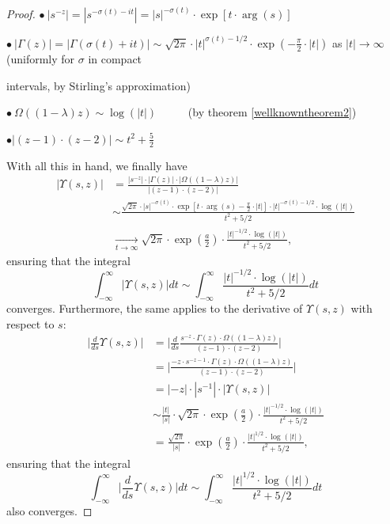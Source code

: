 \documentclass[11pt]{amsart}
\numberwithin{equation}{section}
\newcommand{\diint}{\displaystyle \int}
\newcommand{\difrac}{\displaystyle \frac}
\begin{document}
\begin{proof}
\noindent $\bullet \ |s^{-z}| = |s^{-\sigma(t) - it}| = |s|^{-\sigma(t)} \cdot \exp[t \cdot \arg(s)]$

\noindent $\bullet \ |\Gamma(z)| = |\Gamma(\sigma(t) + it)| \sim \sqrt{2\pi} \cdot |t|^{\sigma(t) - 1/2} \cdot \exp\left(-\difrac{\pi}{2} \cdot |t|\right)$ as $|t| \to \infty$ (uniformly for $\sigma$ in compact 

\noindent intervals, by Stirling's approximation)

\noindent $\bullet \ \Omega((1 - \lambda)z) \sim \log(|t|)$ \ \ \ \ \ (by theorem \ref{wellknowntheorem2})

\noindent $\bullet |(z - 1) \cdot (z - 2)| \sim t^2 + \difrac{5}{2}$

With all this in hand, we finally have \begin{equation*} \begin{split} |\Upsilon(s, z)| & = \difrac{|s^{-z}| \cdot |\Gamma(z)| \cdot |\Omega((1 - \lambda)z)|}{|(z - 1) \cdot (z - 2)|} \\ & \sim \difrac{\sqrt{2\pi} \cdot |s|^{-\sigma(t)} \cdot \exp\left[t \cdot \arg(s) - \difrac{\pi}{2} \cdot |t|\right] \cdot |t|^{-\sigma(t) - 1/2} \cdot \log(|t|)}{t^2 + 5/2} \\ & \xrightarrow[t \to \infty]{} \sqrt{2\pi} \cdot \exp\left(\difrac{a}{2}\right) \cdot \difrac{|t|^{-1/2} \cdot \log(|t|)}{t^2 + 5/2}, \end{split} \end{equation*} ensuring that the integral $$\diint_{-\infty}^{\infty} |\Upsilon(s, z)| dt \sim \diint_{-\infty}^{\infty} \difrac{|t|^{-1/2} \cdot \log(|t|)}{t^2 + 5/2} dt$$ converges. Furthermore, the same applies to the derivative of $\Upsilon(s, z)$ with respect to $s$: \begin{equation*} \begin{split} \Bigg|\difrac{d}{ds} \Upsilon(s, z)\Bigg| & = \Bigg| \difrac{d}{ds} \difrac{s^{-z} \cdot \Gamma(z) \cdot \Omega((1 - \lambda)z)}{(z - 1) \cdot (z - 2)} \Bigg| \\ & = \Bigg| \difrac{-z \cdot s^{- z - 1} \cdot \Gamma(z) \cdot \Omega((1 - \lambda)z)}{(z - 1) \cdot (z - 2)}\Bigg| \\ & = |-z| \cdot |s^{-1}| \cdot |\Upsilon(s, z)| \\ & \sim \difrac{|t|}{|s|} \cdot \sqrt{2\pi} \cdot \exp\left(\difrac{a}{2}\right) \cdot \difrac{|t|^{-1/2} \cdot \log(|t|)}{t^2 + 5/2} \\ & = \difrac{\sqrt{2\pi}}{|s|} \cdot \exp\left(\difrac{a}{2}\right) \cdot \difrac{|t|^{1/2} \cdot \log(|t|)}{t^2 + 5/2}, \end{split} \end{equation*} ensuring that the integral $$\diint_{-\infty}^{\infty} \Bigg|\difrac{d}{ds} \Upsilon(s, z)\Bigg| dt \sim \diint_{-\infty}^{\infty} \difrac{|t|^{1/2} \cdot \log(|t|)}{t^2 + 5/2} dt$$ also converges.


\end{proof}
\end{document}
